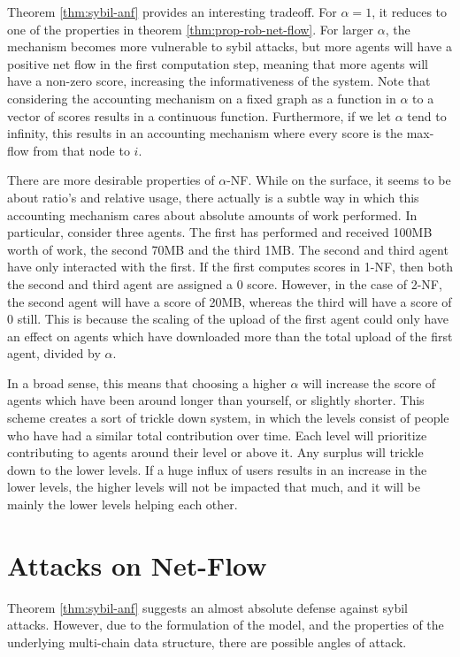 \documentclass[a4paper,11pt]{book}
\theoremstyle{definition}
\begin{document}
Theorem \ref{thm:sybil-anf} provides an interesting tradeoff. For $\alpha=1$, it reduces
to one of the properties in theorem \ref{thm:prop-rob-net-flow}. For larger $\alpha$,
the mechanism becomes more vulnerable to sybil attacks, but more agents will have
a positive net flow in the first computation step, meaning that more agents will
have a non-zero score, increasing the informativeness of the system. Note
that considering the accounting mechanism on a fixed graph as a function in $\alpha$ to
a vector of scores results in a continuous function. Furthermore, if we let $\alpha$
tend to infinity, this results in an accounting mechanism where every score is the
max-flow from that node to $i$. 


There are more desirable properties of $\alpha$-NF. While on the surface, it seems to
be about ratio's and relative usage, there actually is a subtle way in which
this accounting mechanism cares about absolute amounts of work performed. 
In particular, consider three agents. The first has performed and received
100MB worth of work, the second 70MB and the third 1MB. The second and third
agent have only interacted with the first. If the first computes scores
in 1-NF, then both the second and third agent are assigned a 0 score.
However, in the case of 2-NF, the second agent will have a score of 20MB,
whereas the third will have a score of 0 still. This is because the scaling
of the upload of the first agent could only have an effect on agents which
have downloaded more than the total upload of the first agent, divided
by $\alpha$. 

In a broad sense, this means that choosing a higher $\alpha$ will increase the score 
of agents which have been around longer than yourself, or slightly shorter. This
scheme creates a sort of trickle down system, in which the levels consist of people
who have had a similar total contribution over time. Each level will prioritize
contributing to agents around their level or above it. Any surplus will trickle down
to the lower levels. If a huge influx of users results in an increase in the lower
levels, the higher levels will not be impacted that much, and it will be mainly the
lower levels helping each other.


\section{Attacks on Net-Flow}

Theorem \ref{thm:sybil-anf} suggests an almost absolute defense against sybil attacks. However,
due to the formulation of the model, and the properties of the underlying multi-chain data structure,
there are possible angles of attack.
\end{document}
